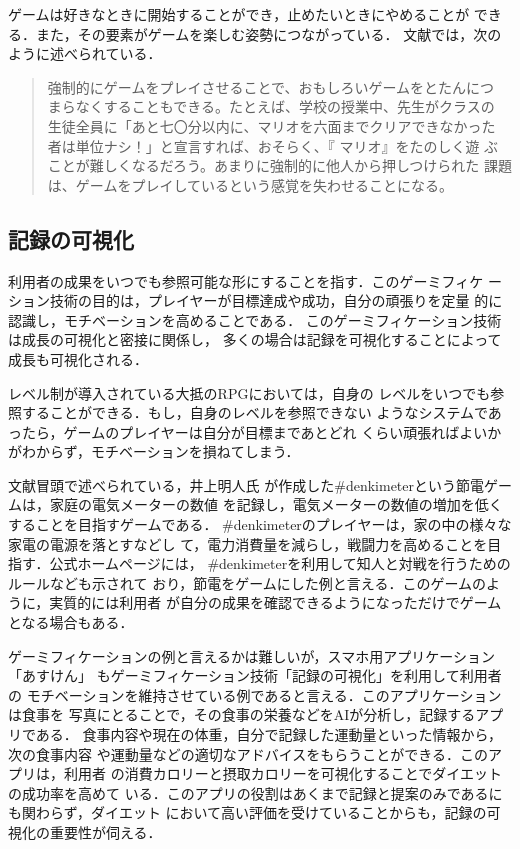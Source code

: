 \documentclass{jreport}
\begin{document}
ゲームは好きなときに開始することができ，止めたいときにやめることが
できる．また，その要素がゲームを楽しむ姿勢につながっている．
文献\cite{Inoue:Gamification}では，次のように述べられている．

\begin{quote}
  強制的にゲームをプレイさせることで、おもしろいゲームをとたんにつ
  まらなくすることもできる。たとえば、学校の授業中、先生がクラスの
  生徒全員に「あと七〇分以内に、マリオを六面までクリアできなかった
  者は単位ナシ！」と宣言すれば、おそらく、『 マリオ』をたのしく遊
  ぶことが難しくなるだろう。あまりに強制的に他人から押しつけられた
  課題は、ゲームをプレイしているという感覚を失わせることになる。
  \cite{Inoue:Gamification}
\end{quote}

\subsection{記録の可視化}
利用者の成果をいつでも参照可能な形にすることを指す．このゲーミフィケ
ーション技術の目的は，プレイヤーが目標達成や成功，自分の頑張りを定量
的に認識し，モチベーションを高めることである．
このゲーミフィケーション技術は成長の可視化と密接に関係し，
多くの場合は記録を可視化することによって成長も可視化される．

レベル制が導入されている大抵のRPGにおいては，自身の
レベルをいつでも参照することができる．もし，自身のレベルを参照できない
ようなシステムであったら，ゲームのプレイヤーは自分が目標まであとどれ
くらい頑張ればよいかがわからず，モチベーションを損ねてしまう．

文献\cite{Inoue:Gamification}冒頭で述べられている，井上明人氏
が作成した\#denkimeterという節電ゲームは，家庭の電気メーターの数値
を記録し，電気メーターの数値の増加を低くすることを目指すゲームである．
\#denkimeterのプレイヤーは，家の中の様々な家電の電源を落とすなどし
て，電力消費量を減らし，戦闘力を高めることを目指す．公式ホームページ\cite{denkimeter}には，
\#denkimeterを利用して知人と対戦を行うためのルールなども示されて
おり，節電をゲームにした例と言える．このゲームのように，実質的には利用者
が自分の成果を確認できるようになっただけでゲームとなる場合もある．

ゲーミフィケーションの例と言えるかは難しいが，スマホ用アプリケーション
「あすけん」\cite{Asuken}
もゲーミフィケーション技術「記録の可視化」を利用して利用者の
モチベーションを維持させている例であると言える．このアプリケーションは食事を
写真にとることで，その食事の栄養などをAIが分析し，記録するアプリである．
食事内容や現在の体重，自分で記録した運動量といった情報から，次の食事内容
や運動量などの適切なアドバイスをもらうことができる．このアプリは，利用者
の消費カロリーと摂取カロリーを可視化することでダイエットの成功率を高めて
いる．このアプリの役割はあくまで記録と提案のみであるにも関わらず，ダイエット
において高い評価を受けていることからも，記録の可視化の重要性が伺える．
\end{document}
